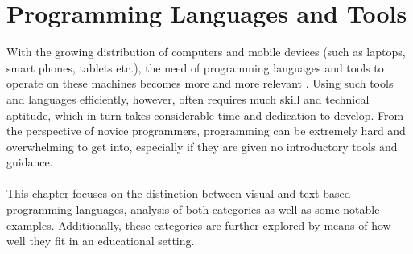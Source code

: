 \chapter{Programming Languages and Tools}
\label{chap:languages_and_tools}

With the growing distribution of computers and mobile devices (such as laptops, smart phones, tablets etc.), the need of programming languages and tools to operate on these machines becomes more and more relevant . Using such tools and languages efficiently, however, often requires much skill and technical aptitude, which in turn takes considerable time and dedication to develop. From the perspective of novice programmers, programming can be extremely hard and overwhelming to get into, especially if they are given no introductory tools and guidance.\\\\
This chapter focuses on the distinction between visual and text based programming languages, analysis of both categories as well as some notable examples. Additionally, these categories are further explored by means of how well they fit in an educational setting.   
	


